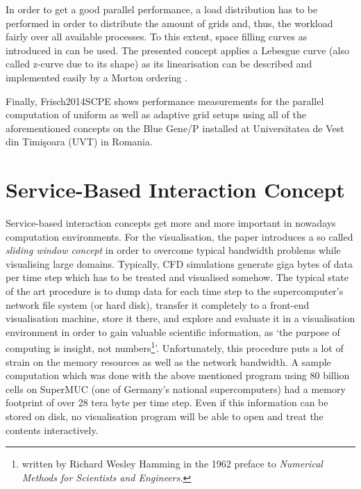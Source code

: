 \documentclass[10pt, conference]{IEEEtran}
\begin{document}
In order to get a good parallel performance, a load distribution has to be performed in order to distribute the amount of grids and, thus, the workload fairly over all available processes. To this
extent, space filling curves as introduced in \cite{Bader2013} can be used. The presented concept applies a Lebesgue curve \cite{Lebesgue1904} (also called z-curve due to its shape) as its
linearisation can be described and implemented easily by a Morton ordering \cite{Morton1966}.

Finally, {Frisch2014SCPE} shows performance measurements for the parallel computation of uniform as well as adaptive grid setups using all of the aforementioned concepts on the Blue
Gene/P installed at Universitatea de Vest din Timi\c{s}oara (UVT) in Romania.


\section{Service-Based Interaction Concept}
\label{sec:SB_Interaction_Concept}


Service-based interaction concepts get more and more important in nowadays computation environments. For the visualisation, the paper \cite{Mundani2013} introduces a so called {\em sliding window
concept} in order to overcome typical bandwidth problems while visualising large domains. Typically, CFD simulations generate giga bytes of data per time step which has to be treated and
visualised somehow. The typical state of the art procedure is to dump data for each time step to the supercomputer's network file system (or hard disk), transfer it completely to a front-end
visualisation machine, store it there, and explore and evaluate it in a visualisation environment in order to gain valuable scientific information, as `the purpose of computing is insight, not
numbers\footnote{written by Richard Wesley Hamming in the 1962 preface to {\em Numerical Methods for Scientists and Engineers.}}'. Unfortunately, this procedure puts a lot of strain on the
memory resources as well as the network bandwidth. A sample computation which was done with the above mentioned program using 80 billion cells on SuperMUC (one of Germany's national
supercomputers) had a memory footprint of over 28 tera byte per time step. Even if this information can be stored on disk, no visualisation program will be able to open and treat the contents
interactively.
\end{document}
